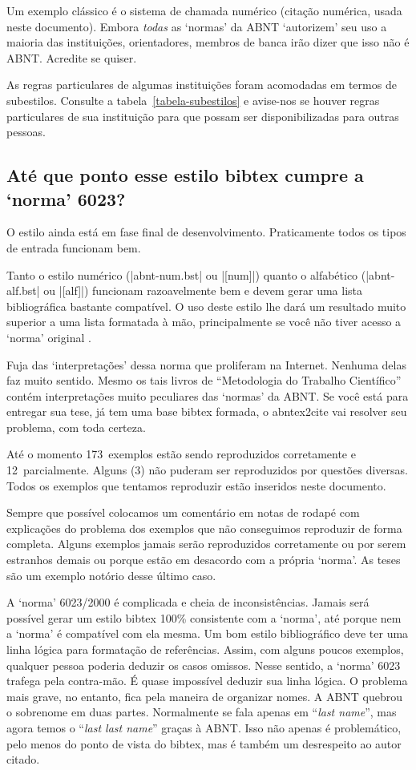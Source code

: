 \documentclass[a4paper]{ltxdoc}
\newcommand{\OKs}{173}
\newcommand{\quaseOKs}{12}
\newcommand{\nadaOK}{3}
\begin{document}
Um exemplo clássico é o sistema de chamada numérico (citação numérica, usada
neste documento). Embora \emph{todas} as `normas' da
ABNT\cite{NBR6023:2000,NBR10520:1988,NBR10520:2001} `autorizem' seu uso a
maioria das instituições, orientadores, membros de banca irão dizer que isso
não é ABNT. Acredite se quiser.

As regras particulares de algumas instituições foram acomodadas em termos de
subestilos. Consulte a tabela~\ref{tabela-subestilos} e avise-nos se houver
regras particulares de sua instituição para que possam ser disponibilizadas
para outras pessoas.

\subsection{Até que ponto esse estilo bibtex cumpre a `norma' 6023?}

O estilo ainda está em fase final de desenvolvimento. Praticamente
todos os tipos de entrada funcionam bem.

Tanto o estilo numérico (|abnt-num.bst| ou |[num]|) quanto o alfabético
(|abnt-alf.bst| ou |[alf]|) funcionam razoavelmente bem e devem
gerar uma lista bibliográfica bastante compatível. O uso deste estilo lhe dará
um resultado muito superior a uma lista formatada à mão, principalmente se você
não tiver acesso a `norma' original \cite{NBR6023:2000}.

Fuja das `interpretações' dessa norma que proliferam na Internet. Nenhuma delas
faz muito sentido. Mesmo os tais livros de ``Metodologia do Trabalho
Científico'' contém interpretações muito peculiares das `normas' da ABNT.
Se você está para entregar sua tese, já tem uma base bibtex formada,
o \textsf{abntex2cite} vai resolver seu problema, com toda certeza.

Até o momento \OKs\ exemplos estão sendo reproduzidos corretamente e \quaseOKs\
parcialmente. Alguns (\nadaOK) não puderam ser reproduzidos por questões
diversas. Todos os exemplos que tentamos reproduzir estão inseridos neste
documento.

Sempre que possível colocamos um comentário em notas de rodapé com explicações
do problema dos exemplos que não conseguimos reproduzir de forma completa.
Alguns exemplos jamais serão reproduzidos corretamente ou por serem estranhos
demais ou porque estão em desacordo com a própria `norma'. As teses são um
exemplo notório desse último caso.

A `norma' 6023/2000\cite{NBR6023:2000} é complicada e cheia de inconsistências.
Jamais será possível gerar um estilo bibtex 100\% consistente com a `norma', até
porque nem a `norma' é compatível com ela mesma. Um bom estilo bibliográfico
deve ter uma linha lógica para formatação de referências. Assim, com alguns
poucos exemplos, qualquer pessoa poderia deduzir os casos omissos. Nesse
sentido, a `norma' 6023 trafega pela contra-mão. É quase impossível deduzir sua
linha lógica. O problema mais grave, no entanto, fica pela maneira de organizar
nomes. A ABNT quebrou o sobrenome em duas partes. Normalmente se fala apenas em
``\textit{last name}'', mas agora temos o ``\textit{last last name}'' graças à
ABNT. Isso não apenas é problemático, pelo menos do ponto de vista do bibtex,
mas é também um desrespeito ao autor citado.
\end{document}
